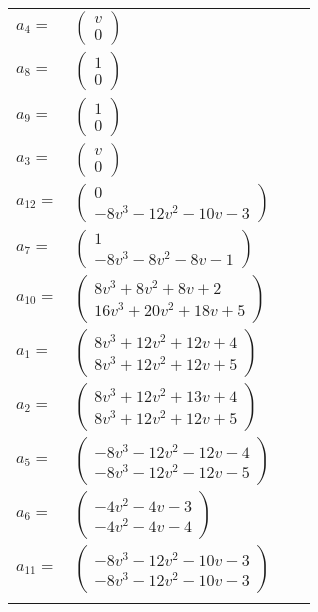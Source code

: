 \documentclass[1p]{elsarticle_modified}
\theoremstyle{definition}
\begin{document}
\begin{tabular}{m{7pt} m{180pt} m{7pt} m{180pt} }
\flushright $a_{4}=$&$\begin{pmatrix}v\\0\end{pmatrix}$ \\
\flushright $a_{8}=$&$\begin{pmatrix}1\\0\end{pmatrix}$ \\
\flushright $a_{9}=$&$\begin{pmatrix}1\\0\end{pmatrix}$ \\
\flushright $a_{3}=$&$\begin{pmatrix}v\\0\end{pmatrix}$ \\
\flushright $a_{12}=$&$\begin{pmatrix}0\\-8 v^3-12 v^2-10 v-3\end{pmatrix}$ \\
\flushright $a_{7}=$&$\begin{pmatrix}1\\-8 v^3-8 v^2-8 v-1\end{pmatrix}$ \\
\flushright $a_{10}=$&$\begin{pmatrix}8 v^3+8 v^2+8 v+2\\16 v^3+20 v^2+18 v+5\end{pmatrix}$ \\
\flushright $a_{1}=$&$\begin{pmatrix}8 v^3+12 v^2+12 v+4\\8 v^3+12 v^2+12 v+5\end{pmatrix}$ \\
\flushright $a_{2}=$&$\begin{pmatrix}8 v^3+12 v^2+13 v+4\\8 v^3+12 v^2+12 v+5\end{pmatrix}$ \\
\flushright $a_{5}=$&$\begin{pmatrix}-8 v^3-12 v^2-12 v-4\\-8 v^3-12 v^2-12 v-5\end{pmatrix}$ \\
\flushright $a_{6}=$&$\begin{pmatrix}-4 v^2-4 v-3\\-4 v^2-4 v-4\end{pmatrix}$ \\
\flushright $a_{11}=$&$\begin{pmatrix}-8 v^3-12 v^2-10 v-3\\-8 v^3-12 v^2-10 v-3\end{pmatrix}$\\&\end{tabular}
\end{document}
